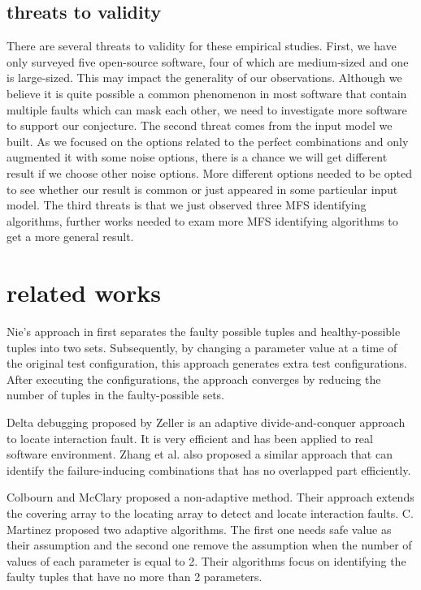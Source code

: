 \documentclass{sig-alternate}
\begin{document}
\subsection{threats to validity}
There are several threats to validity for these empirical studies. First, we have only surveyed five open-source software, four of which are medium-sized and one is large-sized. This may impact the generality of our observations. Although we believe it is quite possible a common phenomenon in most software that contain multiple faults which can mask each other, we need to investigate more software to support our conjecture. The second threat comes from the input model we built. As we focused on the options related to the perfect combinations and only augmented it with some noise options, there is a chance we will get different result if we choose other noise options. More different options needed to be opted to see whether our result is common or just appeared in some particular input model. The third threats is that we just observed three MFS identifying algorithms, further works needed to exam more MFS identifying algorithms to get a more general result.

\section{related works}

Nie's approach in \cite{nie2011minimal} first separates the faulty possible tuples and healthy-possible tuples into two sets. Subsequently, by changing a parameter value at a time of the original test configuration, this approach generates extra test configurations. After executing the configurations, the approach converges by reducing the number of tuples in the faulty-possible sets.

Delta debugging \cite{zeller2002simplifying} proposed by Zeller is an adaptive divide-and-conquer approach to locate interaction fault. It is very efficient and has been applied to real software environment. Zhang et al. \cite{zhang2011characterizing} also proposed a similar approach that can identify the failure-inducing combinations that has no overlapped part efficiently.

Colbourn and McClary \cite{colbourn2008locating} proposed a non-adaptive method. Their approach extends the covering array to the locating array to detect and locate interaction faults. C. Martinez \cite{martinez2008algorithms,martinez2009locating} proposed two adaptive algorithms. The first one needs safe value as their assumption and the second one remove the assumption when the number of values of each parameter is equal to 2. Their algorithms focus on identifying the faulty tuples that have no more than 2 parameters.
\end{document}
